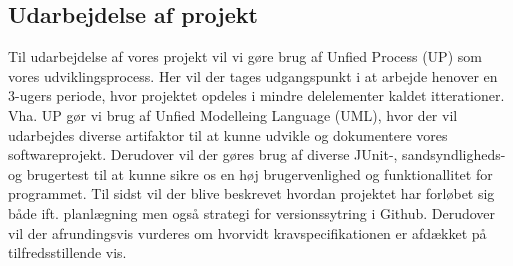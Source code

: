\documentclass[../main.tex]{subfiles}
\begin{document}
\begin{flushleft}
\subsection{Udarbejdelse af projekt}
Til udarbejdelse af vores projekt vil vi gøre brug af Unfied Process (UP) som vores udviklingsprocess. Her vil der tages udgangspunkt i at arbejde henover en 3-ugers periode, hvor projektet opdeles i mindre delelementer kaldet itterationer. Vha. UP gør vi brug af Unfied Modelleing Language (UML), hvor der vil udarbejdes diverse artifaktor til at kunne udvikle og dokumentere vores softwareprojekt. Derudover vil der gøres brug af diverse JUnit-, sandsyndligheds- og brugertest til at kunne sikre os en høj brugervenlighed og funktionallitet for programmet. Til sidst vil der blive beskrevet hvordan projektet har forløbet sig både ift. planlægning men også strategi for versionssytring i Github. Derudover vil der afrundingsvis vurderes om hvorvidt kravspecifikationen er afdækket på tilfredsstillende vis.


\end{flushleft}
\end{document}

